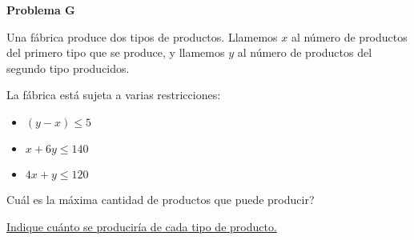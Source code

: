 \begin{center}
\Large \textbf{Problema G} \\
\end{center}

\bigskip

Una fábrica produce dos tipos de productos. Llamemos $x$ al número de productos del primero tipo que se produce, y llamemos $y$ al número de productos del segundo tipo producidos.

\bigskip
La fábrica está sujeta a varias restricciones:
\begin{itemize}
    \item $(y - x) \le 5$
    \item $x + 6y \le 140$
    \item $4x + y \le 120$
\end{itemize}

Cuál es la máxima cantidad de productos que puede producir?

\bigskip

\underline{Indique cuánto se produciría de cada tipo de producto.}

